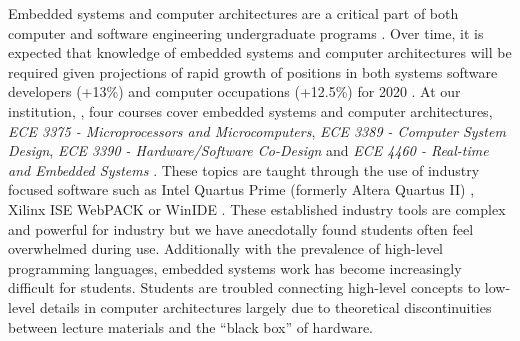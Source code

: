 \begin{comment}
\item Has anyone else done anything similar?
\begin{itemize}
\item Yes. 
\end{itemize}
\item Is your research relevant to research/practice/theory in your field?
\begin{itemize}
\item Education is always required
\item Improvements are required as IoT increases and devices are moving back towards small
microelectronics
\end{itemize}
\item What is already known or understood about this topic?
\begin{itemize}
\item Simulations: \cite{Tappan2009}, \cite{Skrien2001}, \cite{Skillen2011}
\item Curriculum: 
\end{itemize}
\item How might your research add to this understanding, or challenge existing theories and beliefs?
\begin{itemize}
\item Extend on existing solution
\item Propose opportunity to replace multiple configurations, not a single one
\end{itemize}
\end{itemize}
\end{comment}

Embedded systems and computer architectures are a critical part of both computer and software engineering undergraduate programs \cite{cec2016, sec2015, ece-ce-program, Ristov2011, Stolikj2011}. Over time, it is expected that knowledge of embedded systems and computer architectures will be required given projections of rapid growth of positions in both systems software developers (+13\%) and computer occupations (+12.5\%) for 2020 \cite{bls2014}. At our institution, \uwo{}, four courses cover embedded systems and computer architectures, \textit{ECE 3375 - Microprocessors and Microcomputers}, \textit{ECE 3389 - Computer System Design}, \textit{ECE 3390 - Hardware/Software Co-Design} and \textit{ECE 4460 - Real-time and Embedded Systems} \cite{eceOutlines}. These topics are taught through the use of industry focused software such as Intel Quartus Prime (formerly Altera Quartus II) \cite{quartus}, Xilinx ISE WebPACK \cite{xilinxISE} or WinIDE \cite{winide}. These established industry tools are complex and powerful for industry but we have anecdotally found students often feel overwhelmed during use. Additionally with the prevalence of high-level programming languages, embedded systems work has become increasingly difficult for students. Students are troubled connecting high-level concepts to low-level details in computer architectures largely due to theoretical discontinuities between lecture materials and the ``black box'' of hardware. 

